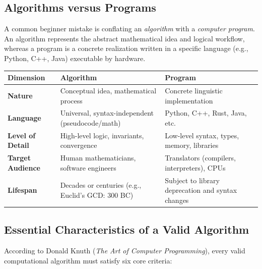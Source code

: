 \documentclass[11pt,a4paper]{article}
\begin{document}
\subsection{Algorithms versus Programs}
A common beginner mistake is conflating an \emph{algorithm} with a \emph{computer program}. An algorithm represents the abstract mathematical idea and logical workflow, whereas a program is a concrete realization written in a specific language (e.g., Python, C++, Java) executable by hardware.

\begin{center}
\begin{tabularx}{\textwidth}{p{3.2cm} X X}
\toprule
\textbf{Dimension} & \textbf{Algorithm} & \textbf{Program} \\
\midrule
\textbf{Nature} & Conceptual idea, mathematical process & Concrete linguistic implementation \\
\textbf{Language} & Universal, syntax-independent (pseudocode/math) & Python, C++, Rust, Java, etc. \\
\textbf{Level of Detail} & High-level logic, invariants, convergence & Low-level syntax, types, memory, libraries \\
\textbf{Target Audience} & Human mathematicians, software engineers & Translators (compilers, interpreters), CPUs \\
\textbf{Lifespan} & Decades or centuries (e.g., Euclid's GCD: 300 BC) & Subject to library deprecation and syntax changes \\
\bottomrule
\end{tabularx}
\end{center}

\subsection{Essential Characteristics of a Valid Algorithm}
According to Donald Knuth (\emph{The Art of Computer Programming}), every valid computational algorithm must satisfy six core criteria:
\end{document}
